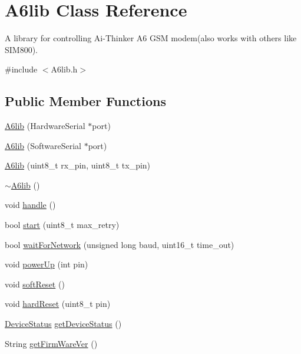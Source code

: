 \hypertarget{class_a6lib}{}\section{A6lib Class Reference}
\label{class_a6lib}


A library for controlling Ai-\/\+Thinker A6 G\+SM modem(also works with others like S\+I\+M800).  




{\ttfamily \#include $<$A6lib.\+h$>$}

\subsection*{Public Member Functions}
\begin{DoxyCompactItemize}
\item 
\mbox{\hyperlink{class_a6lib_a5cbcf78590cf824bfaa16b181b6ac4a1}{A6lib}} (Hardware\+Serial $\ast$port)
\item 
\mbox{\hyperlink{class_a6lib_a415ffc3dc0178a4ee8fdf3e718ef14a9}{A6lib}} (Software\+Serial $\ast$port)
\item 
\mbox{\hyperlink{class_a6lib_a318fb5617771079545af012b28f6a1e7}{A6lib}} (uint8\+\_\+t rx\+\_\+pin, uint8\+\_\+t tx\+\_\+pin)
\item 
\mbox{\hyperlink{class_a6lib_aac4fbb7021b2f1741b01d72b606d5081}{$\sim$\+A6lib}} ()
\item 
void \mbox{\hyperlink{class_a6lib_adcc817ae29dd20892faf53fd3a8b1bac}{handle}} ()
\item 
bool \mbox{\hyperlink{class_a6lib_a811c9dfff81c0a4fbdbc9ce824ad83d3}{start}} (uint8\+\_\+t max\+\_\+retry)
\item 
bool \mbox{\hyperlink{class_a6lib_a47499c54e5e1f117d45ee733d85ea9e4}{wait\+For\+Network}} (unsigned long baud, uint16\+\_\+t time\+\_\+out)
\item 
void \mbox{\hyperlink{class_a6lib_add46e8926e5809cc7e33a7ad2817fcc5}{power\+Up}} (int pin)
\item 
void \mbox{\hyperlink{class_a6lib_a8b64136d0c8aba6af51568ff93a5455e}{soft\+Reset}} ()
\item 
void \mbox{\hyperlink{class_a6lib_a7ddb0b59879dcc59290b72a585231ef2}{hard\+Reset}} (uint8\+\_\+t pin)
\item 
\mbox{\hyperlink{_a6lib_8h_ab202700bbeacce7358281dce3cc27607}{Device\+Status}} \mbox{\hyperlink{class_a6lib_a4f3b148920be62b633fbfde7cf4d9b06}{get\+Device\+Status}} ()
\item 
String \mbox{\hyperlink{class_a6lib_a92cc2f3cd1f793bf1bf77a3b528aba81}{get\+Firm\+Ware\+Ver}} ()

\end{DoxyCompactItemize}
